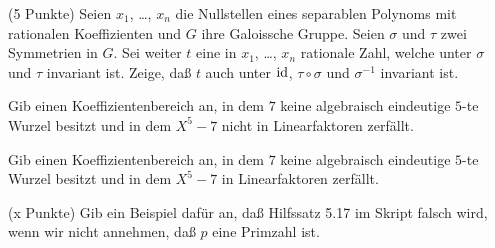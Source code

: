 \documentclass{algsheet}
\author{Dipl.-Math.~Arturo Mancino}
\date{02.~Februar 2011}
\begin{document}
                \maketitle


\begin{exercise}(5 Punkte)\newline
    Seien \(x_1\), \dots, \(x_n\) die Nullstellen eines separablen Polynoms
    mit rationalen Koeffizienten und \(G\) ihre Galoissche Gruppe. Seien
    \(\sigma\) und \(\tau\) zwei Symmetrien in \(G\). Sei weiter \(t\) eine
    in \(x_1\), \dots, \(x_n\) rationale Zahl, welche unter \(\sigma\) und \(\tau\)
    invariant ist. Zeige, daß \(t\) auch unter \(\operatorname{id}\), \(\tau \circ \sigma\)
    und \(\sigma^{-1}\) invariant ist. 
\end{exercise}


\begin{exercise}
    Gib einen Koeffizientenbereich an, in dem \(7\) keine algebraisch eindeutige \(5\)-te Wurzel besitzt
    und in dem \(X^5 - 7\) nicht in Linearfaktoren zerfällt.
\end{exercise}

\begin{exercise}
    Gib einen Koeffizientenbereich an, in dem \(7\) keine algebraisch eindeutige \(5\)-te Wurzel besitzt
    und in dem \(X^5 - 7\) in Linearfaktoren zerfällt.
\end{exercise}



\begin{exercise}(x Punkte)\newline
    Gib ein Beispiel dafür an, daß Hilfssatz 5.17 im Skript falsch wird, wenn wir nicht annehmen,
    daß \(p\) eine Primzahl ist.
\end{exercise}
\end{document}
